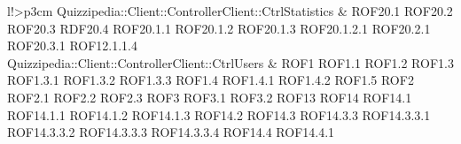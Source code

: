 \begin{tabella}{l!{\VRule}>{\centering\arraybackslash}p{3cm}}
Quizzipedia::Client::ControllerClient::CtrlStatistics & ROF20.1 \linebreak ROF20.2 \linebreak ROF20.3 \linebreak RDF20.4 \linebreak ROF20.1.1 \linebreak ROF20.1.2 \linebreak ROF20.1.3 \linebreak ROF20.1.2.1 \linebreak ROF20.2.1 \linebreak ROF20.3.1 \linebreak ROF12.1.1.4 \\
Quizzipedia::Client::ControllerClient::CtrlUsers & ROF1 \linebreak ROF1.1 \linebreak ROF1.2 \linebreak ROF1.3 \linebreak ROF1.3.1 \linebreak ROF1.3.2 \linebreak ROF1.3.3 \linebreak ROF1.4 \linebreak ROF1.4.1 \linebreak ROF1.4.2 \linebreak ROF1.5 \linebreak ROF2 \linebreak ROF2.1 \linebreak ROF2.2 \linebreak ROF2.3 \linebreak ROF3 \linebreak ROF3.1 \linebreak ROF3.2 \linebreak ROF13 \linebreak ROF14 \linebreak ROF14.1 \linebreak ROF14.1.1 \linebreak ROF14.1.2 \linebreak ROF14.1.3 \linebreak ROF14.2 \linebreak ROF14.3 \linebreak ROF14.3.3 \linebreak ROF14.3.3.1 \linebreak ROF14.3.3.2 \linebreak ROF14.3.3.3 \linebreak ROF14.3.3.4 \linebreak ROF14.4 \linebreak ROF14.4.1 \\

\end{tabella}
